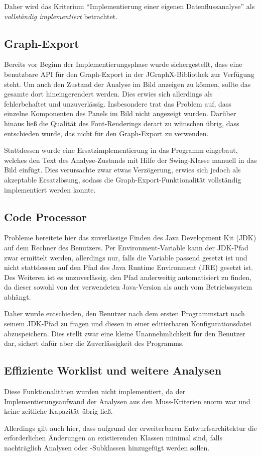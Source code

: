 Daher wird das Kriterium \enquote{Implementierung einer eigenen Datenflussanalyse} als \textit{vollständig implementiert} betrachtet.

\newpage
\subsection{Graph-Export}

Bereits vor Beginn der Implementierungsphase wurde sichergestellt, dass eine benutzbare API für den Graph-Export in der JGraphX-Bibliothek zur Verfügung steht.
Um auch den Zustand der Analyse im Bild anzeigen zu können, sollte das gesamte  dort hineingerendert werden.
Dies erwies sich allerdings als fehlerbehaftet und unzuverlässig. 
Insbesondere trat das Problem auf, dass einzelne Komponenten des Panels im Bild nicht angezeigt wurden.
Darüber hinaus ließ die Qualität des Font-Renderings derart zu wünschen übrig, dass entschieden wurde, das  nicht für den Graph-Export zu verwenden.

Stattdessen wurde eine Ersatzimplementierung in das Programm eingebaut, welches den Text des Analyse-Zustands mit Hilfe der Swing-Klasse  manuell in das Bild einfügt.
Dies verursachte zwar etwas Verzögerung, erwies sich jedoch als akzeptable Ersatzlösung, sodass die Graph-Export-Funktionalität vollständig implementiert werden konnte.

\subsection{Code Processor}

Probleme bereitete hier das zuverlässige Finden des Java Development Kit (JDK) auf dem Rechner des Benutzers.
Per Environment-Variable kann der JDK-Pfad zwar ermittelt werden, allerdings nur, falls die Variable passend gesetzt ist und nicht stattdessen auf den Pfad des Java Runtime Environment (JRE) gesetzt ist.
Des Weiteren ist es unzuverlässig, den Pfad anderweitig automatisiert zu finden, da dieser sowohl von der verwendeten Java-Version als auch vom Betriebssystem abhängt.

Daher wurde entschieden, den Benutzer nach dem ersten Programmstart nach seinem JDK-Pfad zu fragen und diesen in einer editierbaren Konfigurationsdatei abzuspeichern.
Dies stellt zwar eine kleine Unannehmlichkeit für den Benutzer dar, sichert dafür aber die Zuverlässigkeit des Programms.

\subsection{Effiziente Worklist und weitere Analysen}

Diese Funktionalitäten wurden nicht implementiert, da der Implementierungsaufwand der Analysen aus den Muss-Kriterien enorm war und keine zeitliche Kapazität übrig ließ.

Allerdings gilt auch hier, dass aufgrund der erweiterbaren Entwurfsarchitektur die erforderlichen Änderungen an existierenden Klassen minimal sind, falls nachträglich Analysen oder -Subklassen hinzugefügt werden sollen.
